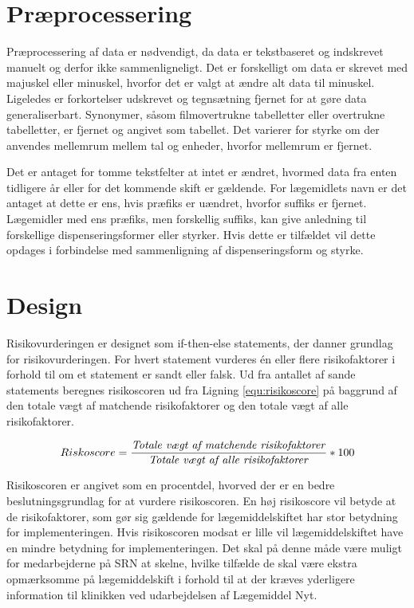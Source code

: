 \section{Præprocessering}
Præprocessering af data er nødvendigt, da data er tekstbaseret og indskrevet manuelt og derfor ikke sammenligneligt. Det er forskelligt om data er skrevet med majuskel eller minuskel, hvorfor det er valgt at ændre alt data til minuskel. Ligeledes er forkortelser udskrevet og tegnsætning fjernet for at gøre data generaliserbart. 
Synonymer, såsom filmovertrukne tabelletter eller overtrukne tabelletter, er fjernet og angivet som tabellet. 
Det varierer for styrke om der anvendes mellemrum mellem tal og enheder, hvorfor mellemrum er fjernet. 

Det er antaget for tomme tekstfelter at intet er ændret, hvormed data fra enten tidligere år eller for det kommende skift er gældende. For lægemidlets navn er det antaget at dette er ens, hvis præfiks er uændret, hvorfor suffiks er fjernet. Lægemidler med ens præfiks, men forskellig suffiks, kan give anledning til forskellige dispenseringsformer eller styrker. Hvis dette er tilfældet vil dette opdages i forbindelse med sammenligning af dispenseringsform og styrke. 

\section{Design}
Risikovurderingen er designet som if-then-else statements, der danner grundlag for risikovurderingen. For hvert statement vurderes én eller flere risikofaktorer i forhold til om et statement er sandt eller falsk. Ud fra antallet af sande statements beregnes risikoscoren ud fra Ligning \ref{equ:risikoscore} på baggrund af den totale vægt af matchende risikofaktorer og den totale vægt af alle risikofaktorer.

\begin{equation}  \label{equ:risikoscore}
Riskoscore = \frac{\mbox{\textit{Totale vægt af matchende risikofaktorer}}}{\mbox{\textit{Totale vægt af alle risikofaktorer}}} * 100
\end{equation}

Risikoscoren er angivet som en procentdel, hvorved der er en bedre beslutningsgrundlag for at vurdere risikoscoren. En høj risikoscore vil betyde at de risikofaktorer, som gør sig gældende for lægemiddelskiftet har stor betydning for implementeringen. Hvis risikoscoren modsat er lille vil lægemiddelskiftet have en mindre betydning for implementeringen. Det skal på denne måde være muligt for medarbejderne på SRN at skelne, hvilke tilfælde de skal være ekstra opmærksomme på lægemiddelskift i forhold til at der kræves yderligere information til klinikken ved udarbejdelsen af Lægemiddel Nyt.  

